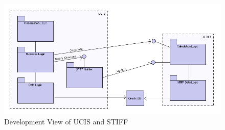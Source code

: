 \begin{figure}[ht]
	\centering
		\includegraphics[width=1.00\textwidth]{img/development-final.png}
	\caption{Development View of UCIS and STIFF}
	\label{fig:development_final}
\end{figure}

